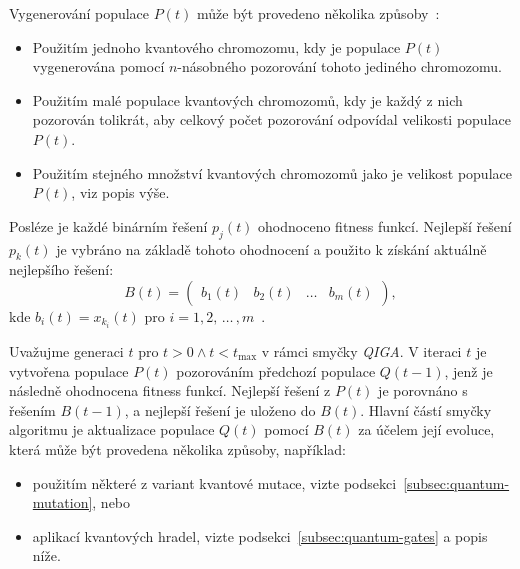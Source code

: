 Vygenerování populace $P\left(t\right)$ může být provedeno několika způsoby~\cite{NaturalComputing}:
\begin{itemize}
    \item Použitím jednoho kvantového chromozomu, kdy je populace $P\left(t\right)$ vygenerována pomocí $n$-násobného pozorování tohoto jediného chromozomu. 
    \item Použitím malé populace kvantových chromozomů, kdy je každý z nich pozorován tolikrát, aby celkový počet pozorování odpovídal velikosti populace $P\left(t\right)$.
    \item Použitím stejného množství kvantových chromozomů jako je velikost populace $P\left(t\right)$, viz popis výše.
\end{itemize}

Posléze je každé binárním řešení $p_j\left(t\right)$ ohodnoceno fitness funkcí. 
Nejlepší řešení $p_k\left(t\right)$ je vybráno na základě tohoto ohodnocení a použito k získání aktuálně nejlepšího řešení:
\begin{equation*}
    B\left(t\right) =
    \begin{pmatrix}
        b_1\left(t\right) & b_2\left(t\right) & \dots & b_m\left(t\right)
    \end{pmatrix},
\end{equation*}
kde $b_i\left(t\right) = x_{k_i}\left(t\right)$ pro $i = 1,2,\,\dots\,,m$~\cite{NaturalComputing,qiga}.

Uvažujme generaci $t$ pro $t>0 \wedge t<t_{\text{max}}$ v rámci smyčky \emph{QIGA}. 
V iteraci $t$ je vytvořena populace $P\left(t\right)$ pozorováním předchozí populace $Q(t-1)$, jenž je následně ohodnocena fitness funkcí. 
Nejlepší řešení z $P\left(t\right)$ je porovnáno s řešením $B(t-1)$, a nejlepší řešení je uloženo do $B\left(t\right)$. 
Hlavní částí smyčky algoritmu je aktualizace populace $Q\left(t\right)$ pomocí $B\left(t\right)$ za účelem její evoluce, která může být provedena několika způsoby, například:
\begin{itemize}
    \item použitím některé z variant kvantové mutace, vizte podsekci~\ref{subsec:quantum-mutation}, nebo
    \item aplikací kvantových hradel, vizte podsekci~\ref{subsec:quantum-gates} a popis níže.
\end{itemize}

